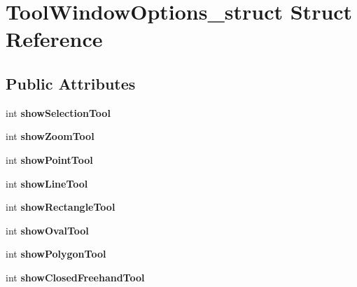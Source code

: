 \hypertarget{structToolWindowOptions__struct}{\section{\-Tool\-Window\-Options\-\_\-struct \-Struct \-Reference}
\label{structToolWindowOptions__struct}
}
\subsection*{\-Public \-Attributes}
\begin{DoxyCompactItemize}
\item 
\hypertarget{structToolWindowOptions__struct_a37a2d358f7be0af2257bf40c1a329168}{int {\bfseries show\-Selection\-Tool}}\label{structToolWindowOptions__struct_a37a2d358f7be0af2257bf40c1a329168}

\item 
\hypertarget{structToolWindowOptions__struct_ab04079af302abbcd0aac8fb670e391a6}{int {\bfseries show\-Zoom\-Tool}}\label{structToolWindowOptions__struct_ab04079af302abbcd0aac8fb670e391a6}

\item 
\hypertarget{structToolWindowOptions__struct_ac0f0f31286f9fa9c48c402c295d40592}{int {\bfseries show\-Point\-Tool}}\label{structToolWindowOptions__struct_ac0f0f31286f9fa9c48c402c295d40592}

\item 
\hypertarget{structToolWindowOptions__struct_ac36f5a1f4522108e54d9dcdfb6eb50c5}{int {\bfseries show\-Line\-Tool}}\label{structToolWindowOptions__struct_ac36f5a1f4522108e54d9dcdfb6eb50c5}

\item 
\hypertarget{structToolWindowOptions__struct_a022e6d6301d916dfa05f7aeb4fe3d143}{int {\bfseries show\-Rectangle\-Tool}}\label{structToolWindowOptions__struct_a022e6d6301d916dfa05f7aeb4fe3d143}

\item 
\hypertarget{structToolWindowOptions__struct_add179e1d442985343d70ea51f3763ef8}{int {\bfseries show\-Oval\-Tool}}\label{structToolWindowOptions__struct_add179e1d442985343d70ea51f3763ef8}

\item 
\hypertarget{structToolWindowOptions__struct_aa85b288fd947d5a40cb1f2a8748b1adc}{int {\bfseries show\-Polygon\-Tool}}\label{structToolWindowOptions__struct_aa85b288fd947d5a40cb1f2a8748b1adc}

\item 
\hypertarget{structToolWindowOptions__struct_a486b04ec9b7dd2c3957bdf27623d6b36}{int {\bfseries show\-Closed\-Freehand\-Tool}}\label{structToolWindowOptions__struct_a486b04ec9b7dd2c3957bdf27623d6b36}


\end{DoxyCompactItemize}
